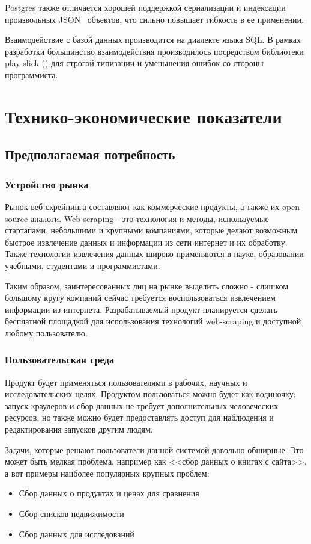 \documentclass[a4paper,12pt]{article}
\begin{document}
    Postgres также отличается хорошей поддержкой сериализации и индексации произвольных JSON~\cite{json} объектов, что сильно повышает гибкость в ее применении.

    Взаимодействие с базой данных производится на диалекте языка SQL. В рамках разработки большинство взаимодействия производилось посредством библиотеки play-slick (\cite{slick}) для строгой типизации и уменьшения ошибок со стороны программиста.
    
						\newpage
	\section{Технико-экономические показатели}
	\subsection{Предполагаемая потребность}
	\subsubsection{Устройство рынка}
	
	Рынок веб-скрейпинга составляют как коммерческие продукты, а также их open source аналоги. Web-scraping - это технология и методы, используемые стартапами, небольшими и крупными компаниями, которые делают возможным быстрое извлечение данных и информации из сети интернет и их обработку. Также технологии извлечения данных широко применяются в науке, образовании учебными, студентами и программистами.
	
	Таким образом, заинтересованных лиц на рынке выделить сложно - слишком большому кругу компаний сейчас требуется воспользоваться извлечением информации из интернета. Разрабатываемый продукт планируется сделать бесплатной площадкой для использования технологий web-scraping и доступной любому пользователю.
	
	\subsubsection{Пользовательская среда}
	
	Продукт будет применяться пользователями в рабочих, научных и исследовательских целях. Продуктом пользоваться можно будет как водиночку: запуск краулеров и сбор данных не требует дополнительных человеческих ресурсов, но также можно будет предоставлять доступ для наблюдения и редактирования запусков другим людям.
	
	Задачи, которые решают пользователи данной системой давольно обширные. Это может быть мелкая проблема, например как <<сбор данных о книгах с сайта>>, а вот примеры наиболее популярных крупных проблем:
	\begin{itemize}
		\item Сбор данных о продуктах и ценах для сравнения
		\item Сбор списков недвижимости
		\item Сбор данных для исследований
	\end{itemize}
	
\end{document}
